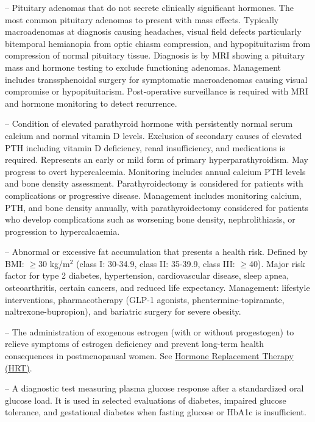 -- Pituitary adenomas that do not secrete clinically significant hormones. The most common pituitary adenomas to present with mass effects. Typically macroadenomas at diagnosis causing headaches, visual field defects particularly bitemporal hemianopia from optic chiasm compression, and hypopituitarism from compression of normal pituitary tissue. Diagnosis is by MRI showing a pituitary mass and hormone testing to exclude functioning adenomas. Management includes transsphenoidal surgery for symptomatic macroadenomas causing visual compromise or hypopituitarism. Post-operative surveillance is required with MRI and hormone monitoring to detect recurrence.

-- Condition of elevated parathyroid hormone with persistently normal serum calcium and normal vitamin D levels. Exclusion of secondary causes of elevated PTH including vitamin D deficiency, renal insufficiency, and medications is required. Represents an early or mild form of primary hyperparathyroidism. May progress to overt hypercalcemia. Monitoring includes annual calcium PTH levels and bone density assessment. Parathyroidectomy is considered for patients with complications or progressive disease. Management includes monitoring calcium, PTH, and bone density annually, with parathyroidectomy considered for patients who develop complications such as worsening bone density, nephrolithiasis, or progression to hypercalcaemia.

-- Abnormal or excessive fat accumulation that presents a health risk. Defined by BMI: \(\ge\)30 kg/m$^2$ (class I: 30-34.9, class II: 35-39.9, class III: \(\ge\)40). Major risk factor for type 2 diabetes, hypertension, cardiovascular disease, sleep apnea, osteoarthritis, certain cancers, and reduced life expectancy. Management: lifestyle interventions, pharmacotherapy (GLP-1 agonists, phentermine-topiramate, naltrexone-bupropion), and bariatric surgery for severe obesity.

-- The administration of exogenous estrogen (with or without progestogen) to relieve symptoms of estrogen deficiency and prevent long-term health consequences in postmenopausal women. See \hyperlink{Hormone Replacement Therapy (HRT)}{Hormone Replacement Therapy (HRT)}.

-- A diagnostic test measuring plasma glucose response after a standardized oral glucose load. It is used in selected evaluations of diabetes, impaired glucose tolerance, and gestational diabetes when fasting glucose or HbA1c is insufficient.

